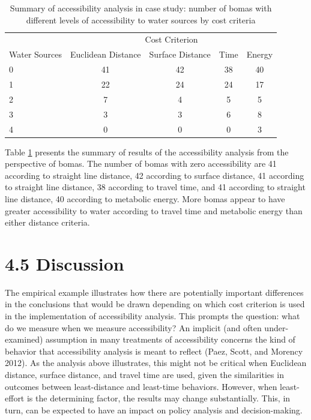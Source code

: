 \documentclass[]{elsarticle} %
\begin{document}
\begin{table}

\caption{\label{tab:table-summary-accessibility}\label{tab:table-summary-accessibility}Summary of accessibility analysis in case study: number of bomas with different levels of accessibility to water sources by cost criteria}
\centering
\begin{tabular}[t]{lcccc}
\toprule
\multicolumn{1}{c}{} & \multicolumn{4}{c}{Cost Criterion} \\
\cmidrule(l{3pt}r{3pt}){2-5}
Water Sources & Euclidean Distance & Surface Distance & Time & Energy\\
\midrule
0 & 41 & 42 & 38 & 40\\
1 & 22 & 24 & 24 & 17\\
2 & 7 & 4 & 5 & 5\\
3 & 3 & 3 & 6 & 8\\
4 & 0 & 0 & 0 & 3\\
\bottomrule
\end{tabular}
\end{table}

Table \ref{tab:table-summary-accessibility} presents the summary of
results of the accessibility analysis from the perspective of bomas. The
number of bomas with zero accessibility are 41 according to straight
line distance, 42 according to surface distance, 41 according to
straight line distance, 38 according to travel time, and 41 according to
straight line distance, 40 according to metabolic energy. More bomas
appear to have greater accessibility to water according to travel time
and metabolic energy than either distance criteria.

\hypertarget{discussion}{%
\section{4.5 Discussion}\label{discussion}}

The empirical example illustrates how there are potentially important
differences in the conclusions that would be drawn depending on which
cost criterion is used in the implementation of accessibility analysis.
This prompts the question: what do we measure when we measure
accessibility? An implicit (and often under-examined) assumption in many
treatments of accessibility concerns the kind of behavior that
accessibility analysis is meant to reflect (Paez, Scott, and Morency
2012). As the analysis above illustrates, this might not be critical
when Euclidean distance, surface distance, and travel time are used,
given the similarities in outcomes between least-distance and least-time
behaviors. However, when least-effort is the determining factor, the
results may change substantially. This, in turn, can be expected to have
an impact on policy analysis and decision-making.
\end{document}
